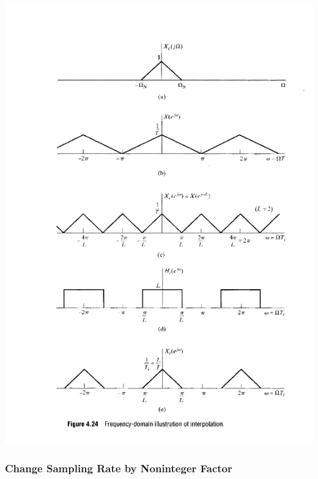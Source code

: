 \documentclass[11pt]{article}
\begin{document}
  \includegraphics[scale=0.7]{graphics/upsampling.png}

  \pagebreak

  \subsubsection{Change Sampling Rate by Noninteger Factor}
\end{document}
